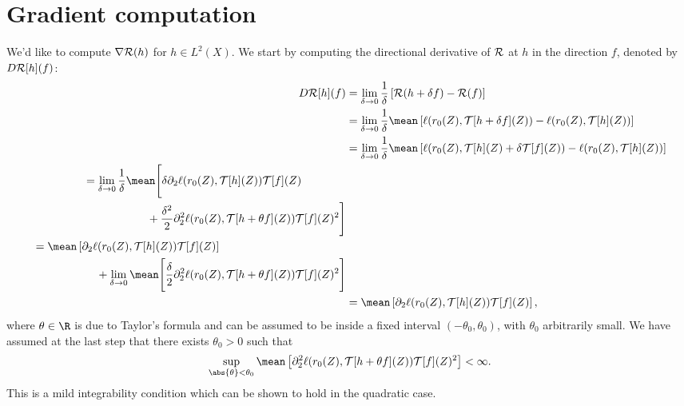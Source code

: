 \section{Gradient computation}

We'd like to compute $ \nabla \mathcal{R} ( h ) $ for $ h \in L^{ 2 } ( X ) $.
We start by computing the directional derivative of $ \mathcal{R} $ at $ h $ in the direction $ f $, denoted by $ D \mathcal{R} [ h ] ( f ) $:
\begin{align*}
    D \risk [ h ] ( f )
    &= \lim\limits_{ \delta \to 0 } \frac{ 1 }{ \delta } \left[
        \risk ( h + \delta f ) - \risk ( f )
    \right] \\
    &= \lim\limits_{ \delta \to 0 } \frac{ 1 }{ \delta } \mean \left[
        \ell ( r_{ 0 } ( Z ), \mathcal{T} [ h + \delta f ] ( Z ) )
        -
        \ell ( r_{ 0 } ( Z ), \mathcal{T} [ h ] ( Z ) )
    \right] \\
    &= \lim\limits_{ \delta \to 0 } \frac{ 1 }{ \delta } \mean \left[
        \ell ( r_{ 0 } ( Z ), \mathcal{T} [ h ] ( Z ) + \delta \mathcal{T} [ f ] ( Z ) )
        -
        \ell ( r_{ 0 } ( Z ), \mathcal{T} [ h ] ( Z ) )
    \right] \\
    \begin{split}
        &= \lim\limits_{ \delta \to 0 } \frac{ 1 }{ \delta } \mean \Biggl[
            \delta \partial_{ 2 } \ell ( r_{ 0 } ( Z ), \mathcal{T} [ h ] ( Z ) ) \mathcal{T} [ f ] ( Z ) \\
        &\hspace{2cm}+ \frac{ \delta^2 }{ 2 } \partial_{ 2 }^2 \ell ( r_{ 0 } ( Z ) , \mathcal{T} [ h + \theta f ] ( Z ) ) \mathcal{T} [ f ] ( Z )^2
        \Biggr]
    \end{split} \\
    \begin{split}
        &= \mean \left[
            \partial_{ 2 } \ell ( r_{ 0 } ( Z ), \mathcal{T} [ h ] ( Z ) ) \mathcal{T} [ f ] ( Z )
        \right] \\
        &\hspace{2cm}+ \lim\limits_{ \delta \to 0 } \mean \Biggl[
            \frac{ \delta }{ 2 } \partial_{ 2 }^2 \ell ( r_{ 0 } ( Z ) , \mathcal{T} [ h + \theta f ] ( Z ) ) \mathcal{T} [ f ] ( Z )^2
        \Biggr]
    \end{split} \\
    &= \mean \left[
        \partial_{ 2 } \ell ( r_{ 0 } ( Z ), \mathcal{T} [ h ] ( Z ) ) \mathcal{T} [ f ] ( Z )
    \right]
,\end{align*}
where $ \theta \in \R $ is due to Taylor's formula and can be assumed to be inside a fixed interval $ ( -\theta_{ 0 }, \theta_{ 0 } ) $, with $ \theta_{ 0 } $ arbitrarily small.
We have assumed at the last step that there exists $ \theta_{ 0 } > 0 $ such that
\begin{equation*}
    \sup_{ \abs{ \theta } < \theta_{ 0 } }
    \mean \left[
        \partial_{ 2 }^2 \ell ( r_{ 0 } ( Z ), \mathcal{T} [ h + \theta f ] ( Z ) ) \mathcal{T} [ f ] ( Z )^2
    \right] < \infty
.\end{equation*}
This is a mild integrability condition which can be shown to hold in the quadratic case.

